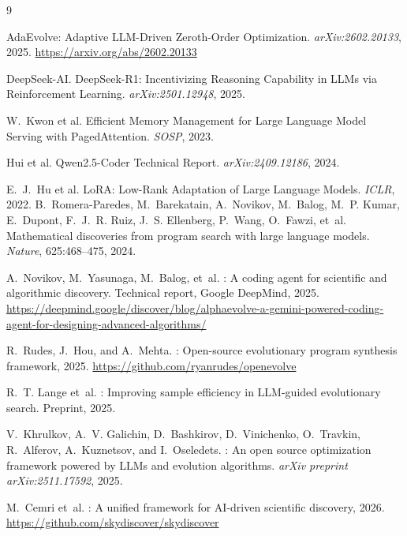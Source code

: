 \documentclass{article}
\begin{document}
\newpage

\begin{thebibliography}{9}

AdaEvolve: Adaptive LLM-Driven Zeroth-Order Optimization.
\textit{arXiv:2602.20133}, 2025.
\url{https://arxiv.org/abs/2602.20133}

DeepSeek-AI.
DeepSeek-R1: Incentivizing Reasoning Capability in LLMs via Reinforcement
Learning.
\textit{arXiv:2501.12948}, 2025.

W.~Kwon et al.
Efficient Memory Management for Large Language Model Serving with
PagedAttention.
\textit{SOSP}, 2023.

Hui et al.
Qwen2.5-Coder Technical Report.
\textit{arXiv:2409.12186}, 2024.

E.~J.~Hu et al.
LoRA: Low-Rank Adaptation of Large Language Models.
\textit{ICLR}, 2022.
B.~Romera-Paredes, M.~Barekatain, A.~Novikov, M.~Balog, M.~P. Kumar,
E.~Dupont, F.~J.~R. Ruiz, J.~S. Ellenberg, P.~Wang, O.~Fawzi, et~al.
\newblock Mathematical discoveries from program search with large language
  models.
\newblock \emph{Nature}, 625:468--475, 2024.

A.~Novikov, M.~Yasunaga, M.~Balog, et~al.
: A coding agent for scientific and algorithmic
  discovery.
\newblock Technical report, Google DeepMind, 2025.
\newblock \url{https://deepmind.google/discover/blog/alphaevolve-a-gemini-powered-coding-agent-for-designing-advanced-algorithms/}

R.~Rudes, J.~Hou, and A.~Mehta.
: Open-source evolutionary program synthesis framework,
  2025.
\newblock \url{https://github.com/ryanrudes/openevolve}

R.~T. Lange et~al.
: Improving sample efficiency in {LLM}-guided
  evolutionary search.
\newblock Preprint, 2025.

V.~Khrulkov, A.~V. Galichin, D.~Bashkirov, D.~Vinichenko, O.~Travkin,
R.~Alferov, A.~Kuznetsov, and I.~Oseledets.
: An open source optimization framework powered by {LLMs}
  and evolution algorithms.
\newblock \emph{arXiv preprint arXiv:2511.17592}, 2025.

M.~Cemri et~al.
: A unified framework for {AI}-driven scientific
  discovery, 2026.
\newblock \url{https://github.com/skydiscover/skydiscover}


\end{thebibliography}
\end{document}
